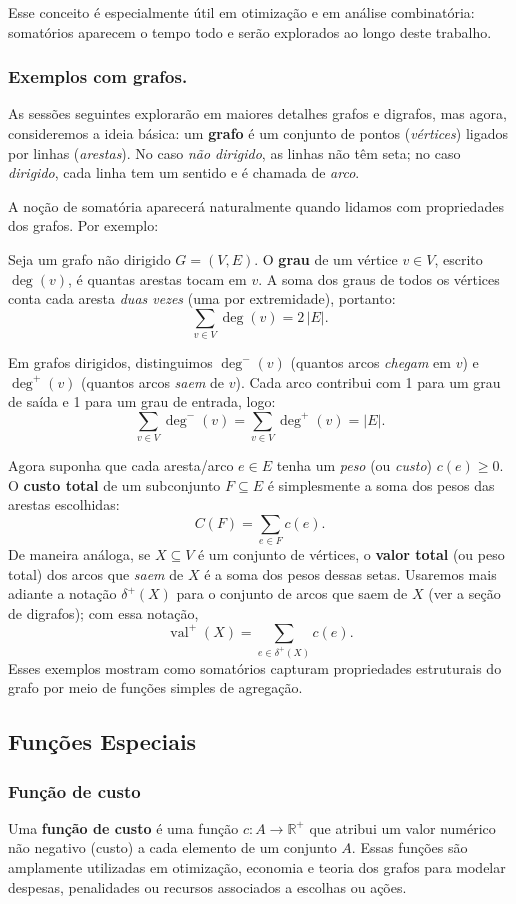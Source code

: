 Esse conceito é especialmente útil em otimização e em análise combinatória: somatórios aparecem o tempo todo e serão explorados ao longo deste trabalho.

\subsubsection{Exemplos com grafos.}
As sessões seguintes explorarão em maiores detalhes grafos e digrafos, mas agora, consideremos a ideia básica: um \textbf{grafo} é um conjunto de pontos (\emph{vértices}) ligados por linhas (\emph{arestas}). No caso \emph{não dirigido}, as linhas não têm seta; no caso \emph{dirigido}, cada linha tem um sentido e é chamada de \emph{arco}.


A noção de somatória aparecerá naturalmente quando lidamos com propriedades dos grafos. Por exemplo:

Seja um grafo não dirigido \(G=(V,E)\). O \textbf{grau} de um vértice \(v\in V\), escrito \(\deg(v)\), é quantas arestas tocam em \(v\). A soma dos graus de todos os vértices conta cada aresta \emph{duas vezes} (uma por extremidade), portanto:
\[\sum_{v\in V} \deg(v) = 2\,|E|.\]

Em grafos dirigidos, distinguimos \(\deg^{-}(v)\) (quantos arcos \emph{chegam} em \(v\)) e \(\deg^{+}(v)\) (quantos arcos \emph{saem} de \(v\)). Cada arco contribui com 1 para um grau de saída e 1 para um grau de entrada, logo:
\[\sum_{v\in V} \deg^{-}(v) = \sum_{v\in V} \deg^{+}(v) = |E|.\]


Agora suponha que cada aresta/arco \(e\in E\) tenha um \emph{peso} (ou \emph{custo}) \(c(e)\ge 0\). O \textbf{custo total} de um subconjunto \(F\subseteq E\) é simplesmente a soma dos pesos das arestas escolhidas:
\[C(F) = \sum_{e\in F} c(e).\]
De maneira análoga, se \(X\subseteq V\) é um conjunto de vértices, o \textbf{valor total} (ou peso total) dos arcos que \emph{saem} de \(X\) é a soma dos pesos dessas setas. Usaremos mais adiante a notação \(\delta^{+}(X)\) para o conjunto de arcos que saem de \(X\) (ver a seção de digrafos); com essa notação,
\[\operatorname{val}^+(X) = \sum_{e\in \delta^{+}(X)} c(e).\]
Esses exemplos mostram como somatórios capturam propriedades estruturais do grafo por meio de funções simples de agregação.

\subsection{Funções Especiais}

\subsubsection{Função de custo}
Uma \textbf{função de custo} é uma função \(c: A \to \mathbb{R}^+\) que atribui um valor numérico não negativo (custo) a cada elemento de um conjunto \(A\). Essas funções são amplamente utilizadas em otimização, economia e teoria dos grafos para modelar despesas, penalidades ou recursos associados a escolhas ou ações.


